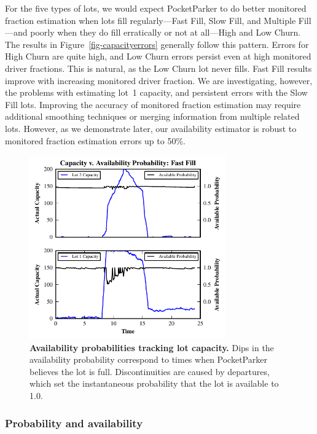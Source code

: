 For the five types of lots, we would expect PocketParker to do better
monitored fraction estimation when lots fill regularly---Fast Fill, Slow
Fill, and Multiple Fill---and poorly when they do fill erratically or not at
all---High and Low Churn. The results in Figure~\ref{fig-capacityerrors}
generally follow this pattern. Errors for High Churn are quite high, and Low
Churn errors persist even at high monitored driver fractions. This is
natural, as the Low Churn lot never fills. Fast Fill results improve with
increasing monitored driver fraction. We are investigating, however, the
problems with estimating lot~1 capacity, and persistent errors with the Slow
Fill lots. Improving the accuracy of monitored fraction estimation may
require additional smoothing techniques or merging information from multiple
related lots. However, as we demonstrate later, our availability estimator is
robust to monitored fraction estimation errors up to 50\%.

\begin{figure}[t]
\centering
\includegraphics[width=3.325in]{./simulator/figures/tracking_fastfill.pdf}

\caption{\textbf{Availability probabilities tracking lot capacity.} Dips in
the availability probability correspond to times when PocketParker believes
the lot is full. Discontinuities are caused by departures, which set the
instantaneous probability that the lot is available to 1.0.}

\label{fig-trackingexample}
\end{figure}

\subsubsection{Probability and availability}

